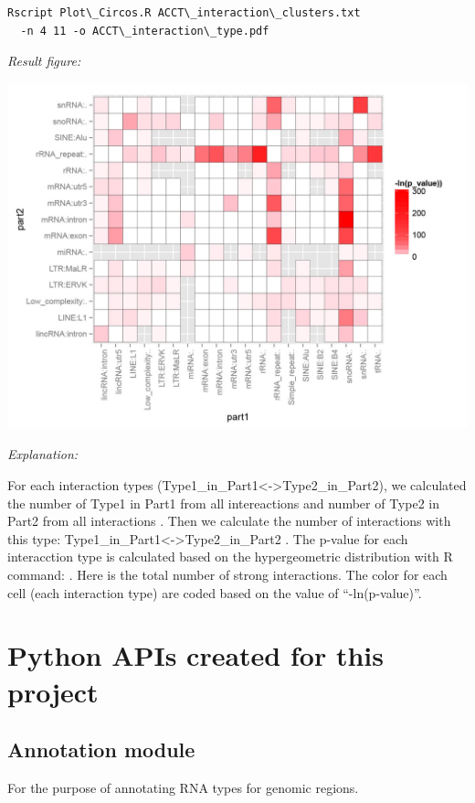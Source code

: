 \documentclass[letterpaper,10pt,english]{sphinxmanual}
\begin{document}
\begin{Verbatim}[commandchars=\\\{\}]
Rscript Plot\_Circos.R ACCT\_interaction\_clusters.txt
  -n 4 11 -o ACCT\_interaction\_type.pdf
\end{Verbatim}

\emph{Result figure:}

\includegraphics{ES1_interaction_type.jpg}

\emph{Explanation:}

For each interaction types (Type1\_in\_Part1\textless{}-\textgreater{}Type2\_in\_Part2), we calculated the number of Type1 in Part1 from all intereactions  and number of Type2 in Part2 from all interactions . Then we calculate the number of interactions with this type: Type1\_in\_Part1\textless{}-\textgreater{}Type2\_in\_Part2 . The p-value for each interacction type is calculated based on the hypergeometric distribution with R command: . Here  is the total number of strong interactions. The color for each cell (each interaction type) are coded based on the value of ``-ln(p-value)''.


\chapter{Python APIs created for this project}
\label{Other_api:python-apis-created-for-this-project}\label{Other_api::doc}

\section{Annotation module}
\label{Other_api:annotation-module}\label{Other_api:module-Annotation}
For the purpose of annotating RNA types for genomic regions.
\end{document}

